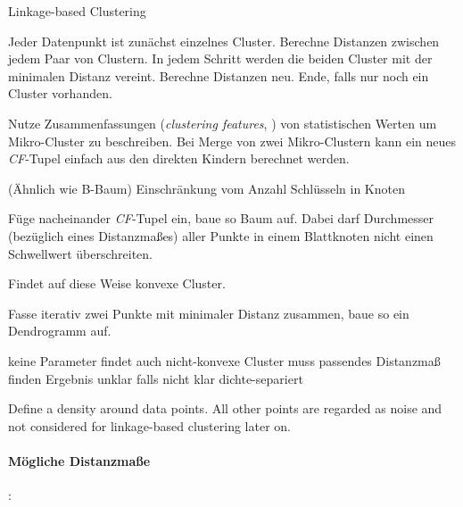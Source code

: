 \documentclass[10pt]{article} %
\begin{document}
\begingroup
\removelatexerror
\begin{algorithm}[H]
   \caption{Linkage-based Clustering}
   Jeder Datenpunkt ist zunächst einzelnes Cluster. Berechne Distanzen zwischen jedem Paar von Clustern.  \;
   In jedem Schritt werden die beiden Cluster mit der minimalen Distanz vereint. \;
   Berechne Distanzen neu. \;
   Ende, falls nur noch ein Cluster vorhanden.
\end{algorithm}
\endgroup

\begin{definition}[BIRCH]
  Nutze Zusammenfassungen (\textit{clustering features}, ) von
  statistischen Werten um Mikro-Cluster zu beschreiben. Bei Merge von zwei
  Mikro-Clustern kann ein neues \textit{CF}-Tupel einfach aus den direkten
  Kindern berechnet werden.
\end{definition}

\begin{definition}[CF-Tree]
  \begin{cptitemize}
  \item (Ähnlich wie B-Baum) Einschränkung vom Anzahl Schlüsseln in Knoten
    \item Füge nacheinander \textit{CF}-Tupel ein, baue so Baum auf. Dabei darf
      Durchmesser (bezüglich eines Distanzmaßes) aller Punkte in einem Blattknoten nicht einen Schwellwert überschreiten.
    \end{cptitemize}
    Findet auf diese Weise konvexe Cluster.
\end{definition}

\begin{definition}
  Fasse iterativ zwei Punkte mit minimaler Distanz zusammen, baue so ein
  Dendrogramm auf.
  \begin{cptitemize}
    \advantageit keine Parameter
    \advantageit findet auch nicht-konvexe Cluster
    \disadvantageit muss passendes Distanzmaß finden
    \disadvantageit Ergebnis unklar falls nicht klar dichte-separiert
  \end{cptitemize}
\end{definition}

\begin{definition}
  Define a density around data points. All other points are regarded as noise
  and not considered for linkage-based clustering later on.
\end{definition}

\paragraph{Mögliche Distanzmaße}:
\end{document}
